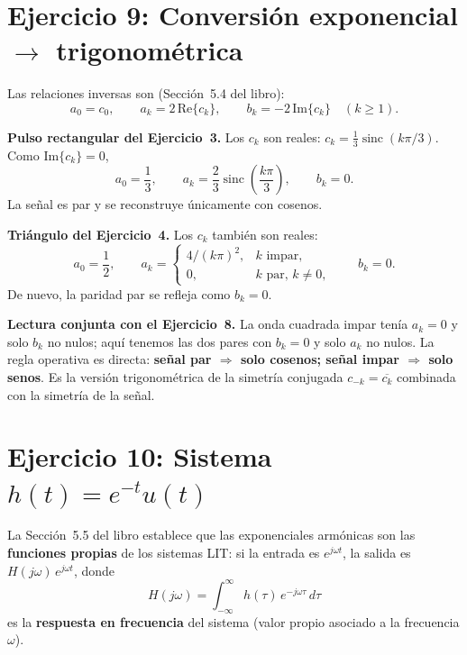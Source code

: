 \documentclass[10pt,a4paper]{article}
\begin{document}
	\section*{Ejercicio 9: Conversión exponencial $\to$ trigonométrica}

	Las relaciones inversas son (Sección~5.4 del libro):
	\[
		a_0 = c_0, \qquad a_k = 2\,\mathrm{Re}\{c_k\}, \qquad b_k = -2\,\mathrm{Im}\{c_k\} \quad (k \geq 1).
	\]

	\textbf{Pulso rectangular del Ejercicio~3.} Los $c_k$ son reales: $c_k = \tfrac{1}{3}\operatorname{sinc}(k\pi/3)$. Como $\mathrm{Im}\{c_k\} = 0$,
	\[
		\boxed{a_0 = \frac{1}{3}, \qquad a_k = \frac{2}{3}\operatorname{sinc}\!\left(\frac{k\pi}{3}\right), \qquad b_k = 0.}
	\]
	La señal es par y se reconstruye únicamente con cosenos.

	\textbf{Triángulo del Ejercicio~4.} Los $c_k$ también son reales:
	\[
		\boxed{a_0 = \frac{1}{2}, \qquad
		a_k =
		\begin{cases}
			4/(k\pi)^2, & k \text{ impar}, \\
			0, & k \text{ par},\, k \ne 0,
		\end{cases}
		\qquad b_k = 0.}
	\]
	De nuevo, la paridad par se refleja como $b_k = 0$.

	\textbf{Lectura conjunta con el Ejercicio~8.} La onda cuadrada impar tenía $a_k = 0$ y solo $b_k$ no nulos; aquí tenemos las dos pares con $b_k = 0$ y solo $a_k$ no nulos. La regla operativa es directa: \textbf{señal par $\Rightarrow$ solo cosenos; señal impar $\Rightarrow$ solo senos}. Es la versión trigonométrica de la simetría conjugada $c_{-k} = \overline{c_k}$ combinada con la simetría de la señal.

	\section*{Ejercicio 10: Sistema $h(t) = e^{-t}u(t)$}

	La Sección~5.5 del libro establece que las exponenciales armónicas son las \textbf{funciones propias} de los sistemas LIT: si la entrada es $e^{j\omega t}$, la salida es $H(j\omega)\,e^{j\omega t}$, donde
	\[
		H(j\omega) = \int_{-\infty}^{\infty} h(\tau)\,e^{-j\omega\tau}\,d\tau
	\]
	es la \textbf{respuesta en frecuencia} del sistema (valor propio asociado a la frecuencia $\omega$).
\end{document}
